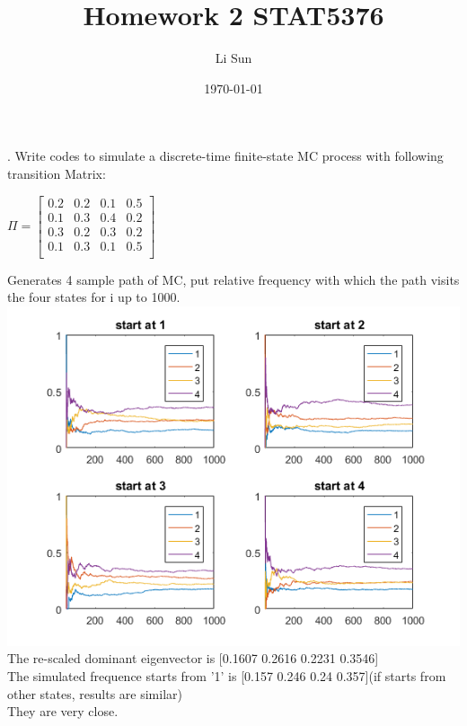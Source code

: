 \documentclass[11pt]{article}
\begin{document}
\title{Homework 2 STAT5376}
\author{Li Sun}
\date{\today}
\maketitle

. Write codes to simulate a discrete-time finite-state MC process with following transition Matrix:\\
\begin{center}
$
\Pi =
\begin{bmatrix}
0.2&0.2&0.1&0.5\\
0.1&0.3&0.4&0.2\\
0.3&0.2&0.3&0.2\\
0.1&0.3&0.1&0.5\\
\end{bmatrix}
$
\end{center} 
Generates 4 sample path of MC, put relative frequency with which the path visits the four states for i up to 1000.\\
\includegraphics[scale=1]{hw2p1.png}
The re-scaled dominant eigenvector is [0.1607 0.2616 0.2231 0.3546]\\
The simulated frequence starts from '1' is [0.157 0.246 0.24 0.357](if starts from other states, results are similar)\\ 
They are very close.\\


\bigskip
\end{document}
